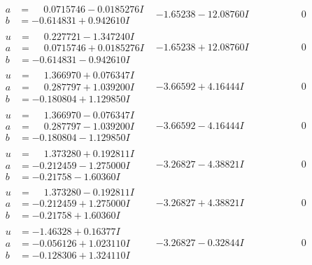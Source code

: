 \documentclass[1p]{elsarticle_modified}
\theoremstyle{definition}
\begin{document}
$$\begin{array}{c|c|c}
\begin{aligned}
a &= \phantom{-}0.0715746 - 0.0185276 I \\
b &= -0.614831 + 0.942610 I\end{aligned}
 & -1.65238 - 12.08760 I & \phantom{-0.000000 } 0 \\ \hline\begin{aligned}
u &= \phantom{-}0.227721 - 1.347240 I \\
a &= \phantom{-}0.0715746 + 0.0185276 I \\
b &= -0.614831 - 0.942610 I\end{aligned}
 & -1.65238 + 12.08760 I & \phantom{-0.000000 } 0 \\ \hline\begin{aligned}
u &= \phantom{-}1.366970 + 0.076347 I \\
a &= \phantom{-}0.287797 + 1.039200 I \\
b &= -0.180804 + 1.129850 I\end{aligned}
 & -3.66592 + 4.16444 I & \phantom{-0.000000 } 0 \\ \hline\begin{aligned}
u &= \phantom{-}1.366970 - 0.076347 I \\
a &= \phantom{-}0.287797 - 1.039200 I \\
b &= -0.180804 - 1.129850 I\end{aligned}
 & -3.66592 - 4.16444 I & \phantom{-0.000000 } 0 \\ \hline\begin{aligned}
u &= \phantom{-}1.373280 + 0.192811 I \\
a &= -0.212459 - 1.275000 I \\
b &= -0.21758 - 1.60360 I\end{aligned}
 & -3.26827 - 4.38821 I & \phantom{-0.000000 } 0 \\ \hline\begin{aligned}
u &= \phantom{-}1.373280 - 0.192811 I \\
a &= -0.212459 + 1.275000 I \\
b &= -0.21758 + 1.60360 I\end{aligned}
 & -3.26827 + 4.38821 I & \phantom{-0.000000 } 0 \\ \hline\begin{aligned}
u &= -1.46328 + 0.16377 I \\
a &= -0.056126 + 1.023110 I \\
b &= -0.128306 + 1.324110 I\end{aligned}
 & -3.26827 - 0.32844 I & \phantom{-0.000000 } 0 \\ \hline\begin{aligned}

\end{aligned}
\end{array}$$
\end{document}
